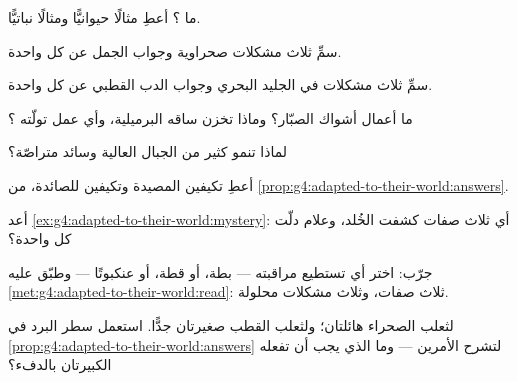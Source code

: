 \begin{exercise}[$\star$]\label{exo:g4:adapted-to-their-world:1}
ما ؟ أعطِ مثالًا حيوانيًّا ومثالًا نباتيًّا.
\end{exercise}

\begin{exercise}[$\star$]\label{exo:g4:adapted-to-their-world:2}
سمِّ ثلاث مشكلات صحراوية وجواب الجمل عن كل واحدة.
\end{exercise}

\begin{exercise}[$\star$]\label{exo:g4:adapted-to-their-world:3}
سمِّ ثلاث مشكلات في الجليد البحري وجواب الدب القطبي عن كل واحدة.
\end{exercise}

\begin{exercise}[$\star$]\label{exo:g4:adapted-to-their-world:4}
ما أعمال أشواك الصبّار؟ وماذا تخزن ساقه البرميلية، وأي عمل تولّته
؟
\end{exercise}

\begin{exercise}[$\star$]\label{exo:g4:adapted-to-their-world:5}
لماذا تنمو كثير من  الجبال العالية وسائد متراصّة؟
\end{exercise}

\begin{exercise}[$\star$]\label{exo:g4:adapted-to-their-world:6}
أعطِ تكيفين  المصيدة وتكيفين للصائدة، من
\cref{prop:g4:adapted-to-their-world:answers}.
\end{exercise}

\begin{exercise}[$\star$]\label{exo:g4:adapted-to-their-world:7}
أعد \cref{ex:g4:adapted-to-their-world:mystery}: أي ثلاث صفات
كشفت الخُلد، وعلام دلّت كل واحدة؟
\end{exercise}

\begin{exercise}[$\star$]\label{exo:g4:adapted-to-their-world:8}
جرّب: اختر أي  تستطيع مراقبته --- بطة، أو قطة، أو عنكبوتًا ---
وطبّق عليه \cref{met:g4:adapted-to-their-world:read}: ثلاث صفات،
وثلاث مشكلات محلولة.
\end{exercise}

\begin{exercise}[$\star\star$]\label{exo:g4:adapted-to-their-world:9}
لثعلب الصحراء  هائلتان؛ ولثعلب القطب  صغيرتان جدًّا.
استعمل سطر البرد في \cref{prop:g4:adapted-to-their-world:answers}
لتشرح الأمرين --- وما الذي يجب أن تفعله  الكبيرتان بالدفء؟
\end{exercise}

